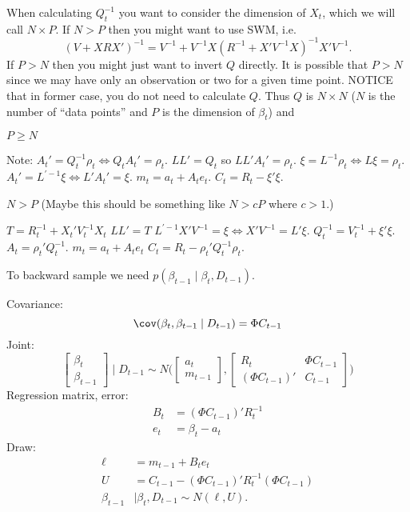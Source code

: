 \documentclass{article}
\begin{document}
When calculating $Q_t^{-1}$ you want to consider the dimension of $X_t$, which
we will call $N \times P$.  If $N > P$ then you might want to use SWM, i.e.
\[
(V + XRX')^{-1} = V^{-1} + V^{-1} X(R^{-1} + X'V^{-1}X)^{-1}X' V^{-1}.
\]
If $P > N$ then you might just want to invert $Q$ directly.  It is possible that
$P > N$ since we may have only an observation or two for a given time point.
NOTICE that in former case, you do not need to calculate $Q$.  Thus $Q$ is $N
\times N$ ($N$ is the number of ``data points'' and $P$ is the dimension of
$\beta_t$) and
\begin{outline}
\1 $P \geq N$

  \2 Note: $A_t' = Q_t^{-1} \rho_t \iff Q_t A_t' = \rho_t$.
  \2 $L L' = Q_t$ so $LL' A_t' = \rho_t$.
  \2 $\xi = L^{-1} \rho_t \iff L \xi = \rho_t$.
  \2 $A_t' = L^{'-1} \xi \iff L'A_t' = \xi$.
  \2 $m_t = a_t + A_t e_t$.
  \2 $C_t = R_t - \xi' \xi$.

\1 $N > P$ (Maybe this should be something like $N > c P$ where $c > 1$.)

  \2 $T = R_t^{-1} + X_t'V_t^{-1}X_t$
  \2 $LL' = T$
  \2 $L^{'-1} X'V^{-1} = \xi \iff X'V^{-1} = L' \xi$.
  \2 $Q_t^{-1} = V_t^{-1} + \xi' \xi$.
  \2 $A_t = \rho_t' Q_t^{-1}$.
  \2 $m_t = a_t + A_t e_t$
  \2 $C_t = R_t - \rho_t' Q_t^{-1} \rho_t$.

\end{outline}

To backward sample we need $p(\beta_{t-1} \mid \beta_t, D_{t-1})$.
\begin{outline}
\1 Covariance:
\[
\cov(\beta_t, \beta_{t-1} \mid D_{t-1}) = \Phi C_{t-1}
\]
\1 Joint:
\[
\begin{bmatrix}
\beta_t \\ \beta_{t-1}
\end{bmatrix}
\mid D_{t-1}
\sim
N
\Big(
\begin{bmatrix}
a_t \\ m_{t-1}
\end{bmatrix},
\begin{bmatrix}
R_t & \Phi C_{t-1} \\
(\Phi C_{t-1})' & C_{t-1}
\end{bmatrix}
\Big)
\]
\1 Regression matrix, error:
\begin{align*}
B_t & = (\Phi C_{t-1})' R_t^{-1} \\
e_t & = \beta_t - a_t
\end{align*}
\1 Draw:
\begin{align*}
\ell & = m_{t-1} + B_t e_t \\
U & = C_{t-1} - (\Phi C_{t-1})' R_t^{-1} (\Phi C_{t-1}) \\
\beta_{t-1} & \mid \beta_t, D_{t-1} \sim N(\ell, U).
\end{align*}
\end{outline}
\end{document}
